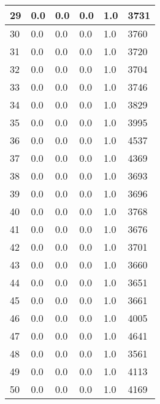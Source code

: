 \begin{longtable}{|l|l|l|l|l|l|}
29 & 0.0 & 0.0 & 0.0 & 1.0 & 3731 \\ \hline 
30 & 0.0 & 0.0 & 0.0 & 1.0 & 3760 \\ \hline 
31 & 0.0 & 0.0 & 0.0 & 1.0 & 3720 \\ \hline 
32 & 0.0 & 0.0 & 0.0 & 1.0 & 3704 \\ \hline 
33 & 0.0 & 0.0 & 0.0 & 1.0 & 3746 \\ \hline 
34 & 0.0 & 0.0 & 0.0 & 1.0 & 3829 \\ \hline 
35 & 0.0 & 0.0 & 0.0 & 1.0 & 3995 \\ \hline 
36 & 0.0 & 0.0 & 0.0 & 1.0 & 4537 \\ \hline 
37 & 0.0 & 0.0 & 0.0 & 1.0 & 4369 \\ \hline 
38 & 0.0 & 0.0 & 0.0 & 1.0 & 3693 \\ \hline 
39 & 0.0 & 0.0 & 0.0 & 1.0 & 3696 \\ \hline 
40 & 0.0 & 0.0 & 0.0 & 1.0 & 3768 \\ \hline 
41 & 0.0 & 0.0 & 0.0 & 1.0 & 3676 \\ \hline 
42 & 0.0 & 0.0 & 0.0 & 1.0 & 3701 \\ \hline 
43 & 0.0 & 0.0 & 0.0 & 1.0 & 3660 \\ \hline 
44 & 0.0 & 0.0 & 0.0 & 1.0 & 3651 \\ \hline 
45 & 0.0 & 0.0 & 0.0 & 1.0 & 3661 \\ \hline 
46 & 0.0 & 0.0 & 0.0 & 1.0 & 4005 \\ \hline 
47 & 0.0 & 0.0 & 0.0 & 1.0 & 4641 \\ \hline 
48 & 0.0 & 0.0 & 0.0 & 1.0 & 3561 \\ \hline 
49 & 0.0 & 0.0 & 0.0 & 1.0 & 4113 \\ \hline 
50 & 0.0 & 0.0 & 0.0 & 1.0 & 4169 \\ \hline 
\end{longtable}